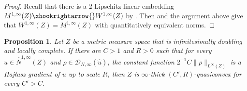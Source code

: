 \documentclass[reqno]{amsart}
\numberwithin{equation}{section}
\newtheorem{proposition}[theorem]{Proposition}
\theoremstyle{remark}
\begin{document}
\begin{proof}
Recall that there is a $2$-Lipschitz linear embedding $M^{1,\infty}(Z) \xhookrightarrow{} W^{1,\infty}(Z)$ by . Then  and the argument above give that $W^{1,\infty}(Z) = M^{1,\infty}(Z)$ with quantitatively equivalent norms.
\end{proof}

\begin{proposition}\label{prop:Hajlasz:to:thick}
Let $Z$ be a metric measure space that is infinitesimally doubling and locally complete. If there are $C > 1$ and $R > 0$ such that for every $\widehat{u} \in \widehat{N}^{1,\infty}( Z )$ and $\rho \in \mathcal{D}_{N,\infty}( \widehat{u} )$, the constant function $2^{-1}C \| \rho \|_{ L^{\infty}(Z) }$ is a Haj{\l}asz gradient of $u$ up to scale $R$, then $Z$ is $\infty$-thick $(C',R)$-quasiconvex for every $C' > C$.
\end{proposition}
\end{document}
